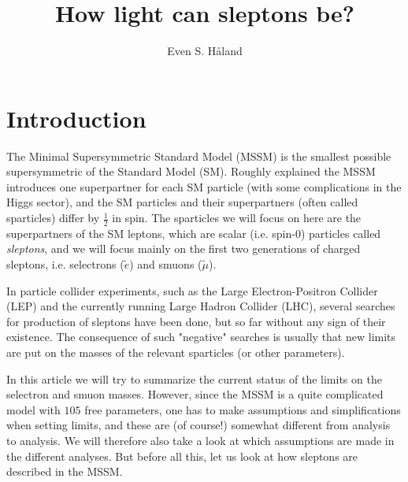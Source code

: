 \documentclass[twocolumn,a4paper,10pt]{article}
\author{Even S. Håland}
\title{How light can sleptons be?}
\begin{document}

\section{Introduction}

The Minimal Supersymmetric Standard Model (MSSM) is the smallest possible supersymmetric 
of the Standard Model (SM). Roughly explained the MSSM introduces one superpartner for each 
SM particle (with some complications in the Higgs sector), and the SM particles and their 
superpartners (often called sparticles) differ by $\frac{1}{2}$ in spin. 
The sparticles we will focus on here are the superpartners of the SM leptons, which are scalar (i.e. 
spin-$0$) particles called \textit{sleptons}, and we will focus mainly on the first two generations of 
charged sleptons, i.e. selectrons ($\tilde{e}$) and smuons ($\tilde{\mu}$).  

In particle collider experiments, such as the Large Electron-Positron Collider (LEP) and the currently 
running Large Hadron Collider (LHC), several searches for production of sleptons have been done, but 
so far without any sign of their existence. The consequence of such "negative" searches is usually 
that new limits are put on the masses of the relevant sparticles (or other parameters).              

In this article we will try to summarize the current status of the limits on the selectron and smuon 
masses. However, since the MSSM is a quite complicated model with $105$ free parameters, one has to make 
assumptions and simplifications when setting limits, and these are (of course!) somewhat different from 
analysis to analysis. We will therefore also take a look at which assumptions are made in the different  
analyses. But before all this, let us look at how sleptons are described in the MSSM.          
\end{document}
